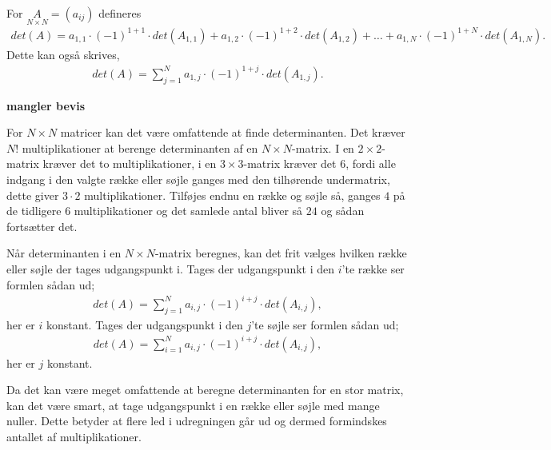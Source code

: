 \begin{defn}
For $\underset{N \times N}{A}=(a_{ij})$ defineres 
\begin{align*}
det(A)=a_{1,1} \cdot (-1)^{1+1} \cdot det(A_{1,1}) + a_{1,2} \cdot (-1)^{1+2} \cdot det(A_{1,2}) + \dots + a_{1,N} \cdot (-1)^{1+N} \cdot det(A_{1,N}).
\end{align*}
Dette kan også skrives, 
\begin{align*}
det(A)=\sum_{j=1}^{N} a_{1,j} \cdot (-1)^{1+j} \cdot det(A_{1,j}).
\end{align*}
\end{defn}

\textbf{mangler bevis}

For $N \times N$ matricer kan det være omfattende at finde determinanten. Det kræver $N!$ multiplikationer at berenge determinanten af en $N \times N$-matrix. I en $2 \times 2$-matrix kræver det to multiplikationer, i en $3 \times 3$-matrix kræver det 6, fordi alle indgang i den valgte række eller søjle ganges med den tilhørende undermatrix, dette giver $3 \cdot 2$ multiplikationer. Tilføjes endnu en række og søjle så,  ganges $4$ på de tidligere $6$ multiplikationer og det samlede antal bliver så $24$ og sådan fortsætter det.\\

\begin{stn}
Når determinanten i en $N \times N$-matrix beregnes, kan det frit vælges hvilken række eller søjle der tages udgangspunkt i. Tages der udgangspunkt i den $i$'te række ser formlen sådan ud;
\begin{align*}
det(A)=\sum_{j=1}^{N}a_{i,j} \cdot (-1)^{i+j} \cdot det(A_{i,j}),
\end{align*}
her er $i$ konstant. Tages der udgangspunkt i den $j$'te søjle ser formlen sådan ud;
\begin{align*}
det(A)=\sum_{i=1}^{N}a_{i,j} \cdot (-1)^{i+j} \cdot det(A_{i,j}),
\end{align*}
her er $j$ konstant.
\end{stn}

Da det kan være meget omfattende at beregne determinanten for en stor matrix, kan det være smart, at tage udgangspunkt i en række eller søjle med mange nuller.
Dette betyder at flere led i udregningen går ud og dermed formindskes antallet af multiplikationer. 

